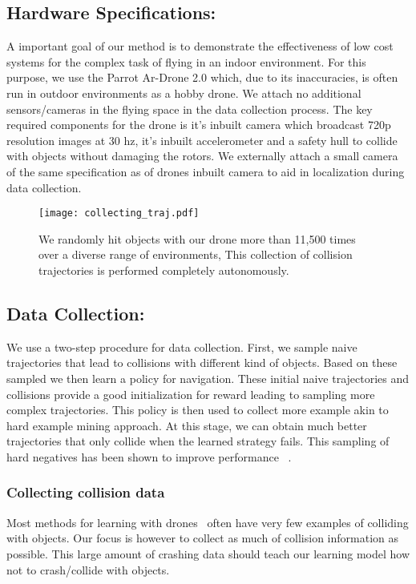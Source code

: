 \documentclass[letterpaper, 10 pt, conference]{ieeeconf}  %
\begin{document}
\subsection{Hardware Specifications:}
A important goal of our method is to demonstrate the effectiveness of low cost systems for the complex task of flying in an indoor environment. For this purpose, we use the  Parrot Ar-Drone 2.0 which, due to its inaccuracies, is often run in outdoor environments as a hobby drone. We attach no additional sensors/cameras in the flying space in the data collection process. The key required components for the drone is it's inbuilt camera which broadcast 720p resolution images at 30 hz, it's inbuilt accelerometer and a safety hull to collide with objects without damaging the rotors. We externally attach a small camera of the same specification as of  drones inbuilt camera to aid in localization during data collection.

\begin{figure*}[t!]
\centering
\texttt{[image: collecting\_traj.pdf]}
\caption{We randomly hit objects with our drone more than 11,500 times over a diverse range of environments, This collection of collision trajectories is performed completely autonomously.
}
\label{fig:collecting_traj}
\end{figure*}\subsection{Data Collection:}
We use a two-step procedure for data collection. First, we sample naive trajectories that lead to collisions with different kind of objects. Based on these sampled we then learn a policy for navigation. These initial naive trajectories and collisions provide a good initialization for reward leading to sampling more complex trajectories. This policy is then used to collect more example akin to hard example mining approach. At this stage, we can obtain much better trajectories that only collide when the learned strategy fails. This sampling of hard negatives has been shown to improve performance ~\cite{pinto2016supersizing,DBLP:journals/corr/ShrivastavaGG16}.

\subsubsection{Collecting collision data}
Most methods for learning with drones~\cite{ross2013learning, bills2011autonomous} often have very few examples of colliding with objects. Our focus is however to collect as much of collision information as possible. This large amount of crashing data should teach our learning model how not to crash/collide with objects. 
\end{document}
